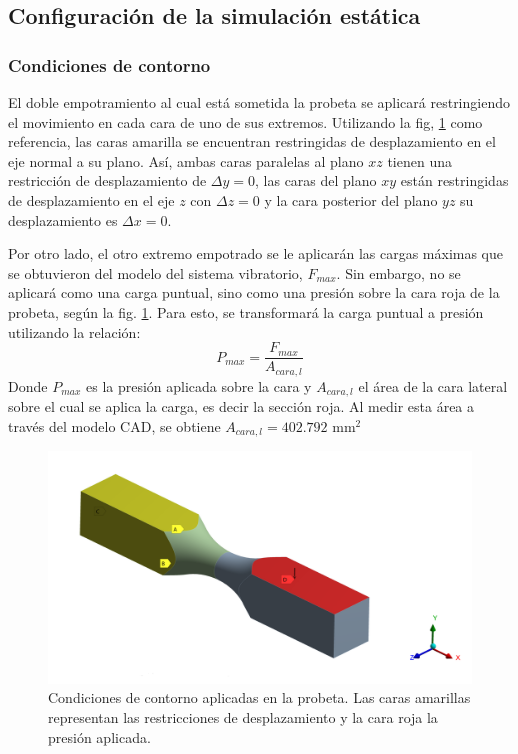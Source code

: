 \newpage

\subsection{Configuración de la simulación estática}
\subsubsection{Condiciones de contorno}
El doble empotramiento al cual está sometida la probeta se aplicará restringiendo el movimiento en cada cara de uno de sus extremos. Utilizando la fig, \ref{fig:cond_borde} como referencia, las caras amarilla se encuentran restringidas de desplazamiento en el eje normal a su plano. Así, ambas caras paralelas al plano $xz$ tienen una restricción de desplazamiento de $\Delta y = 0$, las caras del plano $xy$ están restringidas de desplazamiento en el eje $z$ con $\Delta z = 0$ y la cara posterior del plano $yz$ su desplazamiento es $\Delta x = 0$.

Por otro lado, el otro extremo empotrado se le aplicarán las cargas máximas que se obtuvieron del modelo del sistema vibratorio, $F_{max}$. Sin embargo, no se aplicará como una carga puntual, sino como una presión sobre la cara roja de la probeta, según la fig. \ref{fig:cond_borde}. Para esto, se transformará la carga puntual a presión utilizando la relación:
\begin{equation}\label{eq:p_max}
	P_{max} = \frac{F_{max}}{A_{cara,l}}
\end{equation}
Donde $P_{max}$ es la presión aplicada sobre la cara y $A_{cara,l}$ el área de la cara lateral sobre el cual se aplica la carga, es decir la sección roja. Al medir esta área a través del modelo CAD, se obtiene $A_{cara,l} = 402.792 \text{ mm}^2$

\begin{figure}[h]
\centering
\includegraphics[width=0.7\linewidth]{Imagenes/cond_borde.png}
\caption{Condiciones de contorno aplicadas en la probeta. Las caras amarillas representan las restricciones de desplazamiento y la cara roja la presión aplicada.}
\label{fig:cond_borde}
\end{figure}

